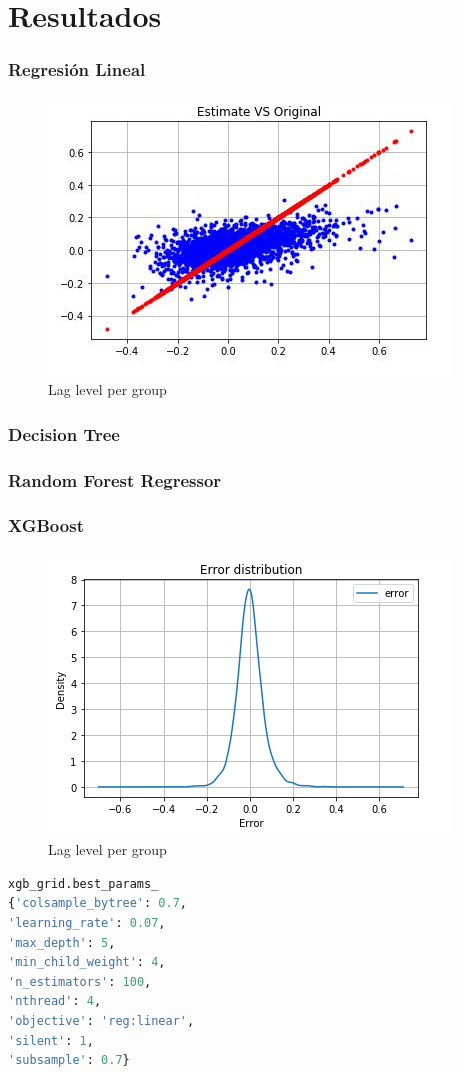 \newpage
\section{Resultados}
\subsubsection{Regresi\'on Lineal}
\begin{figure}[h!]
	\centering
	\includegraphics[width=1\linewidth]{Figure/RegresionLineal_Results.JPG}
	\caption{Lag level per group} 
	\label{fig:TrainingDataSet}
\end{figure}
\subsubsection{Decision Tree}

\subsubsection{Random Forest Regressor}
\subsubsection{XGBoost}

\begin{figure}[h!]
	\centering
	\includegraphics[width=1\linewidth]{Figure/xgbregresor_results.png}
	\caption{Lag level per group} 
	\label{fig:xgbregresor}
\end{figure}

\begin{lstlisting}[language=Python]
xgb_grid.best_params_
{'colsample_bytree': 0.7, 
'learning_rate': 0.07, 
'max_depth': 5, 
'min_child_weight': 4, 
'n_estimators': 100, 
'nthread': 4, 
'objective': 'reg:linear', 
'silent': 1, 
'subsample': 0.7}
\end{lstlisting}
